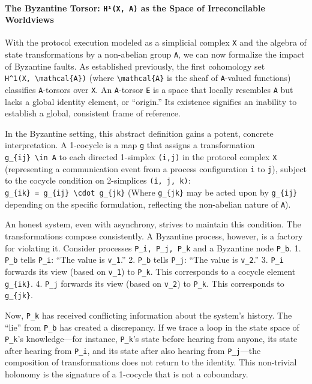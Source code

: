 \documentclass[
]{article}
\begin{document}
\paragraph{\texorpdfstring{The Byzantine Torsor: \texttt{H¹(X,\ A)} as
the Space of Irreconcilable
Worldviews}{The Byzantine Torsor: H¹(X, A) as the Space of Irreconcilable Worldviews}}\label{the-byzantine-torsor-huxb9x-a-as-the-space-of-irreconcilable-worldviews}

With the protocol execution modeled as a simplicial complex \texttt{X}
and the algebra of state transformations by a non-abelian group
\texttt{A}, we can now formalize the impact of Byzantine faults. As
established previously, the first cohomology set
\texttt{H\^{}1(X,\ \textbackslash{}mathcal\{A\})} (where
\texttt{\textbackslash{}mathcal\{A\}} is the sheaf of \texttt{A}-valued
functions) classifies \texttt{A}-torsors over \texttt{X}. An
\texttt{A}-torsor \texttt{E} is a space that locally resembles
\texttt{A} but lacks a global identity element, or ``origin.'' Its
existence signifies an inability to establish a global, consistent frame
of reference.

In the Byzantine setting, this abstract definition gains a potent,
concrete interpretation. A 1-cocycle is a map \texttt{g} that assigns a
transformation \texttt{g\_\{ij\}\ \textbackslash{}in\ A} to each
directed 1-simplex \texttt{(i,j)} in the protocol complex \texttt{X}
(representing a communication event from a process configuration
\texttt{i} to \texttt{j}), subject to the cocycle condition on
2-simplices \texttt{(i,\ j,\ k)}:
\texttt{g\_\{ik\}\ =\ g\_\{ij\}\ \textbackslash{}cdot\ g\_\{jk\}} (Where
\texttt{g\_\{jk\}} may be acted upon by \texttt{g\_\{ij\}} depending on
the specific formulation, reflecting the non-abelian nature of
\texttt{A}).

An honest system, even with asynchrony, strives to maintain this
condition. The transformations compose consistently. A Byzantine
process, however, is a factory for violating it. Consider processes
\texttt{P\_i,\ P\_j,\ P\_k} and a Byzantine node \texttt{P\_b}. 1.
\texttt{P\_b} tells \texttt{P\_i}: ``The value is \texttt{v\_1}.'' 2.
\texttt{P\_b} tells \texttt{P\_j}: ``The value is \texttt{v\_2}.'' 3.
\texttt{P\_i} forwards its view (based on \texttt{v\_1}) to
\texttt{P\_k}. This corresponds to a cocycle element \texttt{g\_\{ik\}}.
4. \texttt{P\_j} forwards its view (based on \texttt{v\_2}) to
\texttt{P\_k}. This corresponds to \texttt{g\_\{jk\}}.

Now, \texttt{P\_k} has received conflicting information about the
system's history. The ``lie'' from \texttt{P\_b} has created a
discrepancy. If we trace a loop in the state space of \texttt{P\_k}'s
knowledge---for instance, \texttt{P\_k}'s state before hearing from
anyone, its state after hearing from \texttt{P\_i}, and its state after
also hearing from \texttt{P\_j}---the composition of transformations
does not return to the identity. This non-trivial holonomy is the
signature of a 1-cocycle that is not a coboundary.
\end{document}
